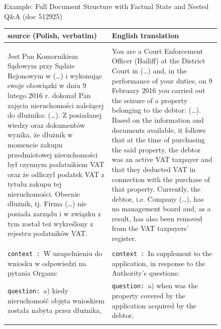 \begin{figure}[!htb]
\begin{examplebox}{Example: Full Document Structure with Factual State and Nested Q\&A (doc 512925)}
\footnotesize
\begin{tabularx}{\linewidth}{@{}>{\raggedright\arraybackslash}X@{\hspace{1em}}>{\raggedright\arraybackslash}X@{}}
\toprule
\textbf{source (Polish, verbatim)} & \textbf{English translation} \\
\midrule

\multicolumn{2}{@{}l}{\textbf{Factual State (\textit{Stan faktyczny})}} \\
\midrule
Jest Pan Komornikiem Sądowym przy Sądzie Rejonowym w (\dots) i wykonując swoje obowiązki w dniu 9 lutego 2016 r. dokonał Pan zajęcia nieruchomości należącej do dłużnika: (\dots). Z posiadanej wiedzy oraz dokumentów wynika, że dłużnik w momencie zakupu przedmiotowej nieruchomości był czynnym podatnikiem VAT oraz że odliczył podatek VAT z tytułu zakupu tej nieruchomości. Obecnie dłużnik, tj. Firma (\dots) nie posiada zarządu i w związku z tym został też wykreślony z rejestru podatników VAT.
&
You are a Court Enforcement Officer (Bailiff) at the District Court in (\dots) and, in the performance of your duties, on 9 February 2016 you carried out the seizure of a property belonging to the debtor: (\dots). Based on the information and documents available, it follows that at the time of purchasing the said property, the debtor was an active VAT taxpayer and that they deducted VAT in connection with the purchase of that property. Currently, the debtor, i.e. Company (\dots), has no management board and, as a result, has also been removed from the VAT taxpayers' register. \\
\addlinespace

\midrule
\multicolumn{2}{@{}l}{\textbf{Supplementary Section (\textit{Uzupełnienie})}} \\
\midrule
\texttt{context :}~W uzupełnieniu do wniosku w odpowiedzi na pytania Organu:
&
\texttt{context :}~In supplement to the application, in response to the Authority's questions: \\
\addlinespace

\texttt{question:}~a) kiedy nieruchomość objęta wnioskiem została nabyta przez dłużnika, &
\texttt{question:}~a) when was the property covered by the application acquired by the debtor, \\
\addlinespace


\end{tabularx}
\end{examplebox}
\end{figure}
